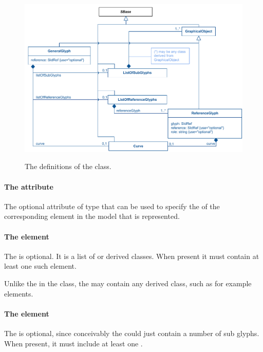 \begin{figure}[!h]
\includegraphics[scale=0.9]{uml/layout-generalglyph-model-uml}\\
\label{uml:generalglyph}
\caption{The definitions of the \GeneralGlyph class.}
\end{figure}

\paragraph{The  attribute}
The optional  attribute of type  that 
can be used to specify the  of the corresponding element in 
the model that is represented. 


\paragraph {The  element}
\label{listofsubglyphs-class}
The \ListOfSubGlyphs is optional. It is a list of \GraphicalObject or 
derived classes. When present it must contain at least one such element. 

Unlike the \ListOfAdditionalGraphicalObjects in the \LayoutClass class, 
the  may contain any derived class, such as for 
example \TextGlyph elements. 


\paragraph {The  element}
\label{listofreferenceglyphs-class}
The \ListOfReferenceGlyphs is optional, since conceivably the 
\GeneralGlyph could just contain a number of sub glyphs. When present, 
it must include at least one \ReferenceGlyph. 



